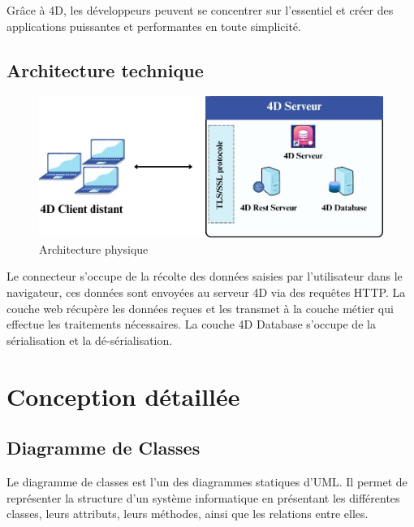 Grâce à 4D, les développeurs peuvent se concentrer sur l’essentiel et créer des applications puissantes et performantes en toute simplicité.


\subsection{Architecture technique}

\begin{figure}[htbp]
   \centering
   \includegraphics[scale=0.6]{Images/physique.jpg} %
   \caption{Architecture physique}
   \label{fig:seq4}
\end{figure}

Le connecteur s’occupe de la récolte des données saisies par l’utilisateur dans le navigateur, ces données sont envoyées au serveur 4D via des requêtes HTTP. La couche web récupère les données reçues et les transmet à la couche métier qui effectue les traitements nécessaires. La couche 4D Database s’occupe de la sérialisation et la dé-sérialisation.

\section{Conception détaillée}
\subsection{Diagramme de Classes}
Le diagramme de classes est l'un des diagrammes statiques d'UML. 
Il permet de représenter la structure d'un système informatique en 
présentant les différentes classes, leurs attributs, leurs méthodes, 
ainsi que les relations entre elles.


